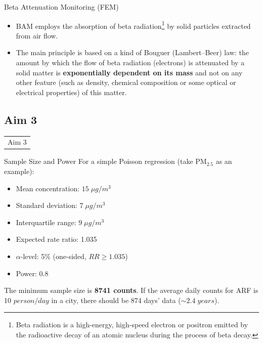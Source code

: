 \documentclass[handout]{beamer} %
\begin{document}
\begin{frame}{Beta Attenuation Monitoring (FEM)}
    \begin{itemize}
        \item BAM employs the absorption of beta radiation\footnote{Beta radiation is a high-energy, high-speed electron or positron emitted by the radioactive decay of an atomic nucleus during the process of beta decay.} by solid particles extracted from air flow. 
        \item The main principle is based on a kind of Bouguer (Lambert–Beer) law: the amount by which the flow of beta radiation (electrons) is attenuated by a solid matter is \textbf{exponentially dependent on its mass} and not on any other feature (such as density, chemical composition or some optical or electrical properties) of this matter.
    \end{itemize}
    
   
\end{frame}


\subsection*{Aim 3}

\begin{frame}{}
    \begin{table}
        \LARGE
        \centering
        \begin{tabular}{c}
             \textcolor[rgb]{0.1,0.1,0.6}{Aim 3}
        \end{tabular}
    \end{table}
\end{frame}

\begin{frame}{Sample Size and Power}
    \label{frm:power}
    For a simple Poisson regression (take PM$_{2.5}$ as an example):
    \begin{itemize}
        \item Mean concentration: $15\;\mu g/m^3$
        \item Standard deviation: $7\;\mu g/m^3$
        \item Interquartile range: $9\;\mu g/m^3$
        \item Expected rate ratio: 1.035
        \item $\alpha$-level: 5\% (one-sided, $RR \geq 1.035$)
        \item Power: 0.8
    \end{itemize}
    The minimum sample size is \textbf{8741 counts}. If the average daily counts for ARF is 10 $person/day$ in a city, there should be 874 days' data ($\sim 2.4\;years$).
\end{frame}
\end{document}
